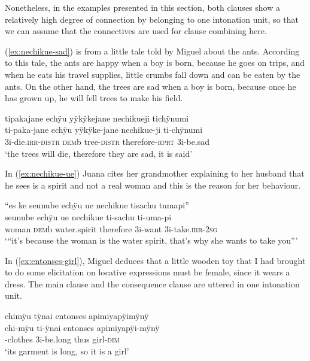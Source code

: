 Nonetheless, in the examples presented in this section, both clauses show a relatively high degree of connection by belonging to one intonation unit, so that we can assume that the connectives are used for clause combining here. 

(\ref{ex:nechikue-sad}) is from a little tale told by Miguel about the ants. According to this tale, the ants are happy when a boy is born, because he goes on trips, and when he eats his travel supplies, little crumbs fall down and can be eaten by the ants. On the other hand, the trees are sad when a boy is born, because once he has grown up, he will fell trees to make his field.

\ea\label{ex:nechikue-sad}
\begingl
\glpreamble tipakajane echÿu yÿkÿkejane nechikueji tichÿnumi\\
\gla ti-paka-jane echÿu yÿkÿke-jane nechikue-ji ti-chÿnumi\\
\glb 3i-die.\textsc{irr}-\textsc{distr} \textsc{dem}b tree-\textsc{distr} therefore-\textsc{rprt} 3i-be.sad\\
\glft ‘the trees will die, therefore they are sad, it is said’
\endgl
{}
\xe

In (\ref{ex:nechikue-ue}) Juana cites her grandmother explaining to her husband that he sees is a spirit and not a real woman and this is the reason for her behaviour.

\ea\label{ex:nechikue-ue}
\begingl
\glpreamble “es ke seunube echÿu ue nechikue tisachu tumapi”\\
 seunube echÿu ue nechikue ti-sachu ti-uma-pi\\
 woman \textsc{dem}b water.spirit therefore 3i-want 3i-take.\textsc{irr}-2\textsc{sg}\\
\glft ‘“it’s because the woman is the water spirit, that’s why she wants to take you”’
\endgl
\trailingcitation{[jxx-p151016l-2.203]}
\xe

In (\ref{ex:entonses-girl}), Miguel deduces that a little wooden toy that I had brought to do some elicitation on locative expressions must be female, since it wears a dress. The main clause and the consequence clause are uttered in one intonation unit.

\ea\label{ex:entonses-girl}
\begingl
\glpreamble chimÿu tÿnai entonses apimiyapÿimÿnÿ\\
\gla chi-mÿu ti-ÿnai entonses apimiyapÿi-mÿnÿ\\
-clothes 3i-be.long thus girl-\textsc{dim}\\
\glft ‘its garment is long, so it is a girl’
\endgl
\trailingcitation{[mox-e110914l-1.049]}
\xe

